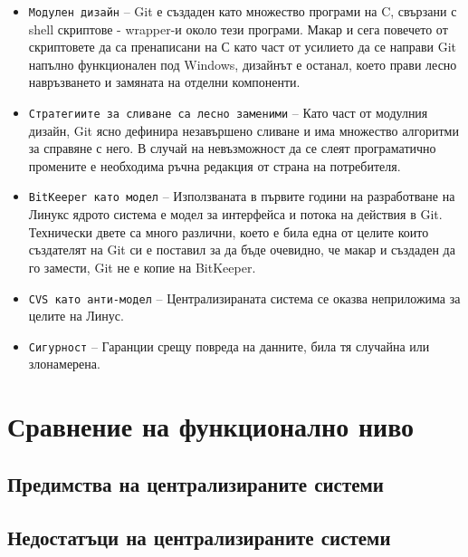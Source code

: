 \documentclass[a4paper]{article}
\begin{document}
\begin{itemize}
      \item \texttt{Модулен дизайн} -- Git е създаден като множество програми на C, свързани с shell скриптове - wrapper-и около тези програми. Макар и сега повечето от скриптовете да са пренаписани на С като част от усилието да се направи Git напълно функционален под Windows, дизайнът е останал, което прави лесно навръзването и замяната на отделни компоненти.
      \item \texttt{Стратегиите за сливане са лесно заменими} -- Като част от модулния дизайн, Git ясно дефинира незавършено сливане и има множество алгоритми за справяне с него. В случай на невъзможност да се слеят програматично промените е необходима ръчна редакция от страна на потребителя.
      \item \texttt{BitKeeper като модел} -- Използваната в първите години на разработване на Линукс ядрото система е модел за интерфейса и потока на действия в Git. Технически двете са много различни, което е била една от целите които създателят на Git си е поставил за да бъде очевидно, че макар и създаден да го замести, Git не е копие на BitKeeper.
      \item \texttt{CVS като анти-модел} -- Централизираната система се оказва неприложима за целите на Линус.
      \item \texttt{Сигурност} -- Гаранции срещу повреда на данните, била тя случайна или злонамерена.
    \end{itemize}

\section{Сравнение на функционално ниво}
  \subsection{Предимства на централизираните системи}

  \subsection{Недостатъци на централизираните системи}
\end{document}
